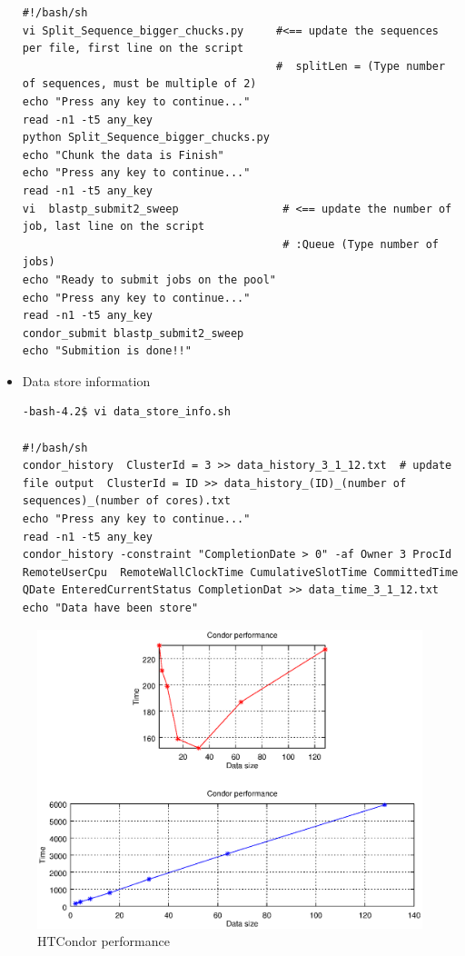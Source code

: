 \documentclass{article}
\begin{document}
\begin{itemize}
\begin{verbatim}
#!/bash/sh
vi Split_Sequence_bigger_chucks.py     #<== update the sequences per file, first line on the script 
                                       #  splitLen = (Type number of sequences, must be multiple of 2)
echo "Press any key to continue..."
read -n1 -t5 any_key
python Split_Sequence_bigger_chucks.py
echo "Chunk the data is Finish"
echo "Press any key to continue..."
read -n1 -t5 any_key
vi  blastp_submit2_sweep                # <== update the number of job, last line on the script 
                                        # :Queue (Type number of jobs)
echo "Ready to submit jobs on the pool"
echo "Press any key to continue..."
read -n1 -t5 any_key
condor_submit blastp_submit2_sweep
echo "Submition is done!!"
\end{verbatim}
\normalsize
\item Data store information
\tiny
\begin{verbatim}
-bash-4.2$ vi data_store_info.sh

#!/bash/sh
condor_history  ClusterId = 3 >> data_history_3_1_12.txt  # update file output  ClusterId = ID >> data_history_(ID)_(number of sequences)_(number of cores).txt
echo "Press any key to continue..."
read -n1 -t5 any_key
condor_history -constraint "CompletionDate > 0" -af Owner 3 ProcId  RemoteUserCpu  RemoteWallClockTime CumulativeSlotTime CommittedTime QDate EnteredCurrentStatus CompletionDat >> data_time_3_1_12.txt
echo "Data have been store"
\end{verbatim}
\normalsize
\end{itemize}

\begin{figure}[htp]
    \centering
    \includegraphics[width=.8\textwidth, height=1\textwidth]{OUTPUT.eps}
    \caption*{HTCondor performance}
    \label{checkerboard_lattice}
\end{figure}
\end{document}
